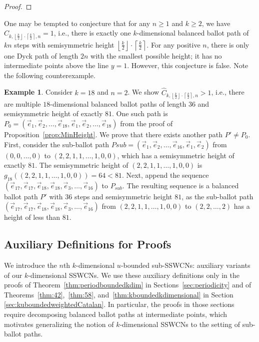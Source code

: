 \documentclass[11pt]{article}
\theoremstyle{remark}
\theoremstyle{definition}
\newtheorem{example}[theorem]{Example}
\begin{document}
\begin{proof}
\end{proof}

One may be tempted to conjecture that for any $n \geq 1$ and $k \geq 2$, we have $\widehat{C}_{k, \left\lfloor\frac{k}{2} \right\rfloor \cdot \left\lceil\frac{k}{2} \right\rceil, n}=1$, i.e., there is exactly one $k$-dimensional balanced ballot path of $kn$ steps with semisymmetric height $\left\lfloor \frac{k}{2} \right\rfloor \cdot \left\lceil \frac{k}{2} \right\rceil$. For any positive $n$, there is only one Dyck path of length $2n$ with the smallest possible height; it has no intermediate points above the line $y=1$. However, this conjecture is false. Note the following counterexample.

\begin{example}
Consider $k=18$ and $n=2$. We show $\widehat{C}_{k, \left\lfloor\frac{k}{2} \right\rfloor \cdot \left\lceil\frac{k}{2} \right\rceil, n} > 1$, i.e., there are multiple $18$-dimensional balanced ballot paths of length $36$ and semisymmetric height of exactly $81$. One such path is $P_0 =(\vec{e}_1, \vec{e}_2, \dots, \vec{e}_{18}, \vec{e}_1, \vec{e}_2, \dots, \vec{e}_{18})$ from the proof of Proposition~\ref{prop:MinHeight}. We prove that there exists another path $P' \neq P_0$. First, consider the sub-ballot path $P{sub} = (\vec{e}_1,\vec{e}_2,\ldots,\vec{e}_{16},\vec{e}_1,\vec{e}_2)$ from $(0, 0, \dots, 0)$ to $(2, 2, 1, 1,\dots, 1,0, 0)$, which has a semisymmetric height of exactly $81$. The semisymmetric height of $(2, 2, 1, 1,\dots, 1,0, 0)$ is $g_{18}((2, 2, 1, 1,\dots, 1,0, 0)) = 64<81$. Next, append the sequence $(\vec{e}_{17}, \vec{e}_{17}, \vec{e}_{18}, \vec{e}_{18}, \vec{e}_3, \dots, \vec{e}_{16})$ to $P_{sub}$. The resulting sequence is a balanced ballot path $P'$ with $36$ steps and semisymmetric height $81$, as the sub-ballot path $(\vec{e}_{17}, \vec{e}_{17}, \vec{e}_{18}, \vec{e}_{18}, \vec{e}_3, \dots, \vec{e}_{16})$ from $(2, 2, 1, 1,\dots, 1,0, 0)$ to $(2, 2, \dots, 2)$ has a height of less than $81$.
\end{example}

\subsection{Auxiliary Definitions for Proofs}\label{sec:Auxiliary}
We introduce the $n$th $k$-dimensional $u$-bounded sub-SSWCNs: auxiliary variants of our $k$-dimensional SSWCNs. We use these auxiliary definitions only in the proofs of Theorem~\ref{thm:periodboundedkdim} in Sections~\ref{sec:periodicity} and of Theorems~\ref{thm:42},~\ref{thm:58}, and~\ref{thm:kboundedkdimensional} in Section \ref{sec:kuboundedweightedCatalan}. In particular, the proofs in those sections require decomposing balanced ballot paths at intermediate points, which motivates generalizing the notion of $k$-dimensional SSWCNs to the setting of sub-ballot paths.
\end{document}
